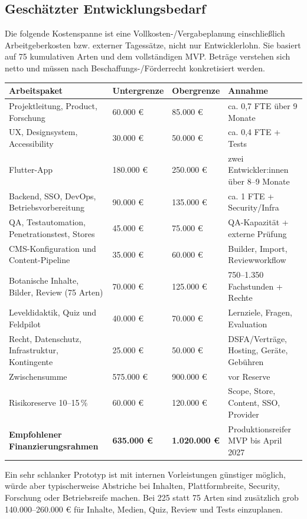 \documentclass[10pt,a4paper,oneside]{article}
\begin{document}
\subsection{Geschätzter Entwicklungsbedarf}

Die folgende Kostenspanne ist eine Vollkosten-/Vergabeplanung einschließlich Arbeitgeberkosten bzw. externer Tagessätze, nicht nur Entwicklerlohn. Sie basiert auf 75 kumulativen Arten und dem vollständigen MVP. Beträge verstehen sich netto und müssen nach Beschaffungs-/Förderrecht konkretisiert werden.

\begin{longtable}{@{}p{56mm}p{27mm}p{27mm}p{47mm}@{}}
\toprule
\textbf{Arbeitspaket} & \textbf{Untergrenze} & \textbf{Obergrenze} & \textbf{Annahme} \\
\midrule
\endhead
Projektleitung, Product, Forschung & 60.000 € & 85.000 € & ca. 0,7 FTE über 9 Monate \\
UX, Designsystem, Accessibility & 30.000 € & 50.000 € & ca. 0,4 FTE + Tests \\
Flutter-App & 180.000 € & 250.000 € & zwei Entwickler:innen über 8--9 Monate \\
Backend, SSO, DevOps, Betriebsvorbereitung & 90.000 € & 135.000 € & ca. 1 FTE + Security/Infra \\
QA, Testautomation, Penetrationstest, Stores & 45.000 € & 75.000 € & QA-Kapazität + externe Prüfung \\
CMS-Konfiguration und Content-Pipeline & 35.000 € & 60.000 € & Builder, Import, Reviewworkflow \\
Botanische Inhalte, Bilder, Review (75 Arten) & 70.000 € & 125.000 € & 750--1.350 Fachstunden + Rechte \\
Leveldidaktik, Quiz und Feldpilot & 40.000 € & 70.000 € & Lernziele, Fragen, Evaluation \\
Recht, Datenschutz, Infrastruktur, Kontingente & 25.000 € & 50.000 € & DSFA/Verträge, Hosting, Geräte, Gebühren \\
\midrule
Zwischensumme & 575.000 € & 900.000 € & vor Reserve \\
Risikoreserve 10--15\,\% & 60.000 € & 120.000 € & Scope, Store, Content, SSO, Provider \\
\midrule
\textbf{Empfohlener Finanzierungsrahmen} & \textbf{635.000 €} & \textbf{1.020.000 €} & Produktionsreifer MVP bis April 2027 \\
\bottomrule
\end{longtable}

Ein sehr schlanker Prototyp ist mit internen Vorleistungen günstiger möglich, würde aber typischerweise Abstriche bei Inhalten, Plattformbreite, Security, Forschung oder Betriebsreife machen. Bei 225 statt 75 Arten sind zusätzlich grob 140.000--260.000 € für Inhalte, Medien, Quiz, Review und Tests einzuplanen.
\end{document}
